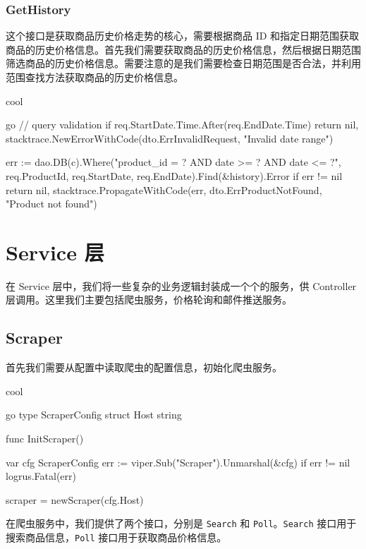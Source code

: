 \subsubsection{GetHistory}

这个接口是获取商品历史价格走势的核心，需要根据商品 ID 和指定日期范围获取商品的历史价格信息。首先我们需要获取商品的历史价格信息，然后根据日期范围筛选商品的历史价格信息。需要注意的是我们需要检查日期范围是否合法，并利用范围查找方法获取商品的历史价格信息。

\begin{codebox}{}{cool}
\begin{amzcode}{go}
// query validation
if req.StartDate.Time.After(req.EndDate.Time) {
    return nil, stacktrace.NewErrorWithCode(dto.ErrInvalidRequest, "Invalid date range")
}

err := dao.DB(c).Where("product_id = ? AND date >= ? AND date <= ?", req.ProductId, req.StartDate, req.EndDate).Find(&history).Error
if err != nil {
    return nil, stacktrace.PropagateWithCode(err, dto.ErrProductNotFound, "Product not found")
}
\end{amzcode}
\end{codebox}

\section{Service 层}

在 Service 层中，我们将一些复杂的业务逻辑封装成一个个的服务，供 Controller 层调用。这里我们主要包括爬虫服务，价格轮询和邮件推送服务。

\subsection{Scraper}

首先我们需要从配置中读取爬虫的配置信息，初始化爬虫服务。

\begin{codebox}{}{cool}
\begin{amzcode}{go}
type ScraperConfig struct {
	Host string
}

func InitScraper() {
	var cfg ScraperConfig
	err := viper.Sub("Scraper").Unmarshal(&cfg)
	if err != nil {
		logrus.Fatal(err)
	}

	scraper = newScraper(cfg.Host)
}
\end{amzcode}
\end{codebox}

在爬虫服务中，我们提供了两个接口，分别是 \texttt{Search} 和 \texttt{Poll}。\texttt{Search} 接口用于搜索商品信息，\texttt{Poll} 接口用于获取商品价格信息。

